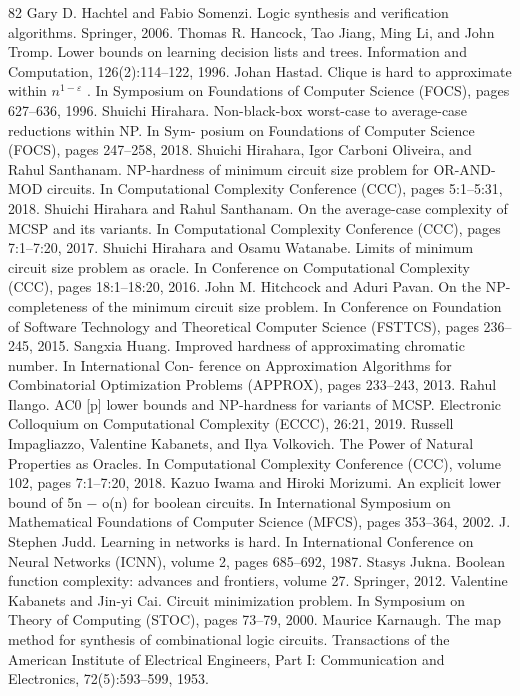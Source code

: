 \documentclass[10pt,a4paper]{article}
\begin{document}
\begin{thebibliography}{82}
Gary D. Hachtel and Fabio Somenzi. Logic synthesis and verification algorithms. Springer, 2006.
Thomas R. Hancock, Tao Jiang, Ming Li, and John Tromp. Lower bounds on learning decision lists and trees. Information and Computation, 126(2):114–122, 1996.
Johan Hastad. Clique is hard to approximate within $n^{1-\varepsilon}$ . In Symposium on Foundations of Computer Science (FOCS), pages 627–636, 1996.
Shuichi Hirahara. Non-black-box worst-case to average-case reductions within NP. In Sym- posium on Foundations of Computer Science (FOCS), pages 247–258, 2018.
Shuichi Hirahara, Igor Carboni Oliveira, and Rahul Santhanam. NP-hardness of minimum circuit size problem for OR-AND-MOD circuits. In Computational Complexity Conference (CCC), pages 5:1–5:31, 2018.
Shuichi Hirahara and Rahul Santhanam. On the average-case complexity of MCSP and its variants. In Computational Complexity Conference (CCC), pages 7:1–7:20, 2017.
Shuichi Hirahara and Osamu Watanabe. Limits of minimum circuit size problem as oracle. In Conference on Computational Complexity (CCC), pages 18:1–18:20, 2016.
John M. Hitchcock and Aduri Pavan. On the NP-completeness of the minimum circuit size problem. In Conference on Foundation of Software Technology and Theoretical Computer Science (FSTTCS), pages 236–245, 2015.
Sangxia Huang. Improved hardness of approximating chromatic number. In International Con- ference on Approximation Algorithms for Combinatorial Optimization Problems (APPROX), pages 233–243, 2013.
Rahul Ilango. AC0 [p] lower bounds and NP-hardness for variants of MCSP. Electronic Colloquium on Computational Complexity (ECCC), 26:21, 2019.
Russell Impagliazzo, Valentine Kabanets, and Ilya Volkovich. The Power of Natural Properties as Oracles. In Computational Complexity Conference (CCC), volume 102, pages 7:1–7:20, 2018.
Kazuo Iwama and Hiroki Morizumi. An explicit lower bound of 5n − o(n) for boolean circuits. In International Symposium on Mathematical Foundations of Computer Science (MFCS), pages 353–364, 2002.
J. Stephen Judd. Learning in networks is hard. In International Conference on Neural Networks (ICNN), volume 2, pages 685–692, 1987.
Stasys Jukna. Boolean function complexity: advances and frontiers, volume 27. Springer, 2012.
Valentine Kabanets and Jin-yi Cai. Circuit minimization problem. In Symposium on Theory of Computing (STOC), pages 73–79, 2000.
Maurice Karnaugh. The map method for synthesis of combinational logic circuits. Transactions of the American Institute of Electrical Engineers, Part I: Communication and Electronics, 72(5):593–599, 1953.

\end{thebibliography}
\end{document}
